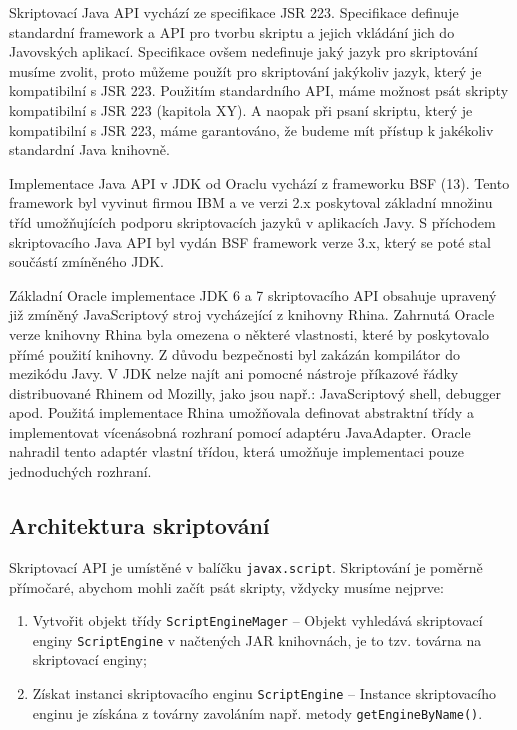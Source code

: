 Skriptovací Java API vychází ze specifikace JSR 223. Specifikace definuje standardní framework a API pro tvorbu skriptu a jejich vkládání jich do Javovských aplikací. Specifikace ovšem nedefinuje jaký jazyk pro skriptování musíme zvolit, proto můžeme použít pro skriptování jakýkoliv jazyk, který je kompatibilní s JSR 223. Použitím standardního API, máme možnost psát skripty kompatibilní s JSR 223 (kapitola XY). A naopak při psaní skriptu, který je kompatibilní s JSR 223, máme garantováno, že budeme mít přístup k jakékoliv standardní Java knihovně.

Implementace Java API v JDK od Oraclu vychází z frameworku BSF (13). Tento framework byl vyvinut firmou IBM a ve verzi 2.x poskytoval základní množinu tříd umožňujících podporu skriptovacích jazyků v aplikacích Javy. S příchodem skriptovacího Java API byl vydán BSF framework verze 3.x, který se poté stal součástí zmíněného JDK.

Základní Oracle implementace JDK 6 a 7 skriptovacího API obsahuje upravený již zmíněný JavaScriptový stroj vycházející z knihovny Rhina. Zahrnutá Oracle verze knihovny Rhina byla omezena o některé vlastnosti, které by poskytovalo přímé použití knihovny. Z důvodu bezpečnosti byl zakázán kompilátor do mezikódu Javy. V JDK nelze najít ani pomocné nástroje příkazové řádky distribuované Rhinem od Mozilly, jako jsou např.: JavaScriptový shell, debugger apod. Použitá implementace Rhina umožňovala definovat abstraktní třídy a implementovat vícenásobná rozhraní pomocí adaptéru JavaAdapter. Oracle nahradil tento adaptér vlastní třídou, která umožňuje implementaci pouze jednoduchých rozhraní. 

\subsection{Architektura skriptování}
\label{Chapter.JavaScriptInJavaAnalysis.ScriptingJavaAPI.ArchitectureOfScripting}

\bigskip \noindent Skriptovací API je umístěné v balíčku \texttt{javax.script}. Skriptování je poměrně přímočaré, abychom mohli začít psát skripty, vždycky musíme nejprve:

\begin{enumerate}
  \item Vytvořit objekt třídy \texttt{ScriptEngineMager} -- Objekt vyhledává skriptovací enginy \texttt{ScriptEngine} v načtených JAR knihovnách, je to tzv. továrna na skriptovací enginy;
  \item Získat instanci skriptovacího enginu \texttt{ScriptEngine} -- Instance skriptovacího enginu je získána z továrny zavoláním např. metody \texttt{getEngineByName()}. 
\end{enumerate}

